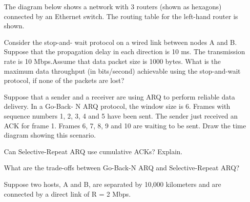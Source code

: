 \documentclass[answers,addpoints]{exam}
\begin{document}
\begin{questions}
\question
The diagram below shows a network with 3 routers (shown as hexagons) connected by an Ethernet switch. The routing table for the left-hand router is shown. 

\question
Consider the stop-and- wait protocol on a wired link between nodes A and B. Suppose that the propagation delay in each direction is 10 ms. The transmission rate is 10 Mbps.Assume that data packet size is 1000 bytes.
What is the maximum data throughput (in bits/second) achievable using the stop-and-wait protocol, if none of the packets are lost?
\fillwithdottedlines{0.5in}

\question
Suppose that a sender and a receiver are using ARQ to perform reliable data delivery. In a Go-Back- N ARQ protocol, the window size is 6. Frames with sequence numbers 1, 2, 3, 4 and 5 have been sent. The sender just received an ACK for frame 1. Frames 6, 7, 8, 9 and 10 are waiting to be sent. Draw the time diagram showing this scenario.
\vspace{3in}


\question
Can Selective-Repeat ARQ use cumulative ACKs? Explain.
\fillwithdottedlines{1in}

\question
What are the trade-offs between Go-Back-N ARQ and Selective-Repeat ARQ?
\fillwithdottedlines{1in}


\question
Suppose two hosts, A and B, are separated by 10,000 kilometers and are connected by a direct link of R = 2 Mbps. 
\end{questions}
\end{document}
